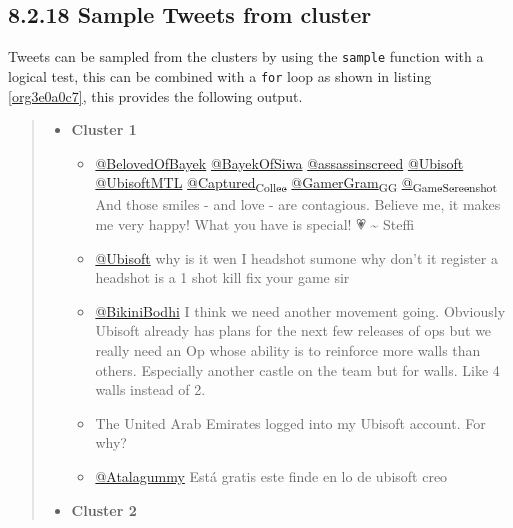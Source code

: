 \documentclass[11pt]{article}
\begin{document}
\subsection{8.2.18 Sample Tweets from cluster}
\label{sec:org6bea235}
Tweets can be sampled from the clusters by using the \texttt{sample} function with a logical test, this can be combined with a \texttt{for} loop as shown in listing \ref{org3e0a0c7}, this provides the following output.


\begin{quote}
\begin{itemize}
\item \textbf{Cluster 1}
\begin{itemize}
\item \href{https://twitter.com/search?q=\%40BelovedOfBayek\&src=typed\_query}{@BelovedOfBayek}
 \href{https://twitter.com/search?q=\%40BayekOfSiwa\&src=typed\_query}{@BayekOfSiwa} \href{https://twitter.com/search?q=\%40assassinscreed\&src=typed\_query}{@assassinscreed} \href{https://twitter.com/search?q=\%40Ubisoft\&src=typed\_query}{@Ubisoft} \href{https://twitter.com/search?q=\%40UbisoftMTL\&src=typed\_query}{@UbisoftMTL}
\href{https://twitter.com/search?q=\%40Captured\_Collec\&src=typed\_query}{@Captured\textsubscript{Collec}} \href{https://twitter.com/search?q=\%40GamerGram\_GG\&src=typed\_query}{@GamerGram\textsubscript{GG}} \href{https://twitter.com/search?q=\%40\_GameScreenshot\&src=typed\_query}{@\textsubscript{GameScreenshot}} And those smiles - and
love - are contagious. Believe me, it makes me very happy! What you have is
special! 💗 \textasciitilde{} Steffi
\item \href{https://twitter.com/search?q=\%40Ubisoft}{@Ubisoft} why is it wen I headshot sumone why don’t it register a headshot
is a 1 shot kill fix your game sir
\item \href{https://twitter.com/search?q=\%40BikiniBodhi}{@BikiniBodhi} I think we need another movement going. Obviously Ubisoft
already has plans for the next few releases of ops but we really need an Op
whose ability is to reinforce more walls than others. Especially another
castle on the team but for walls. Like 4 walls instead of 2.
\item The United Arab Emirates logged into my Ubisoft account. For why?
\item \href{https://twitter.com/search?q=\%40Atalagummy}{@Atalagummy} Está gratis este finde en lo de ubisoft creo
\end{itemize}
\item \textbf{Cluster 2}

\end{itemize}
\end{quote}
\end{document}
